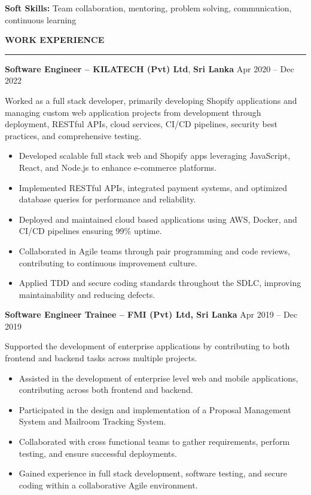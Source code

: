 \documentclass[10pt,letterpaper]{article}
\begin{document}
\textbf{Soft Skills:} Team collaboration, mentoring, problem solving, communication, continuous learning

\vspace{6pt}

\textbf{WORK EXPERIENCE}\\[-8pt]
\noindent\rule{\textwidth}{1pt}

\vspace{1pt}

\textbf{Software Engineer -- KILATECH (Pvt) Ltd}, \textbf{Sri Lanka} \hfill Apr 2020 -- Dec 2022

\vspace{1pt}

Worked as a full stack developer, primarily developing Shopify applications and managing custom web application projects from development through deployment, RESTful APIs, cloud services, CI/CD pipelines, security best practices, and comprehensive testing.

\begin{itemize}
\item Developed scalable full stack web and Shopify apps leveraging JavaScript, React, and Node.js to enhance e-commerce platforms.
\item Implemented RESTful APIs, integrated payment systems, and optimized database queries for performance and reliability.
\item Deployed and maintained cloud based applications using AWS, Docker, and CI/CD pipelines ensuring 99\% uptime.
\item Collaborated in Agile teams through pair programming and code reviews, contributing to continuous improvement culture.
\item Applied TDD and secure coding standards throughout the SDLC, improving maintainability and reducing defects.
\end{itemize}

\textbf{Software Engineer Trainee -- FMI (Pvt) Ltd, Sri Lanka} \hfill Apr 2019 -- Dec 2019

\vspace{1pt}

Supported the development of enterprise applications by contributing to both frontend and backend tasks across multiple projects.

\begin{itemize}
\item Assisted in the development of enterprise level web and mobile applications, contributing across both frontend and backend.
\item Participated in the design and implementation of a Proposal Management System and Mailroom Tracking System.
\item Collaborated with cross functional teams to gather requirements, perform testing, and ensure successful deployments.
\item Gained experience in full stack development, software testing, and secure coding within a collaborative Agile environment.
\end{itemize}
\end{document}
